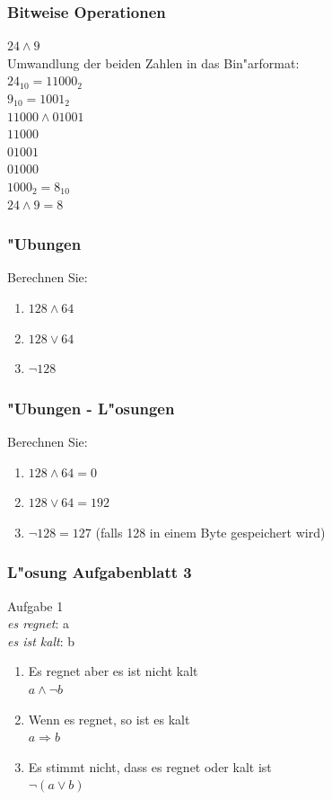 \documentclass{beamer}
\begin{document}
\frame
{
	\frametitle{Bitweise Operationen}
	$24 \land 9$\\
	\vspace{4mm}
	Umwandlung der beiden Zahlen in das Bin"arformat:\\
	$24_{10} = 11000_2$\\
	$9_{10} = 1001_2$\\
	\vspace{4mm}
	$11000 \land 01001$\\
	$11000$\\
	$01001$\\
	$01000$\\
	\vspace{4mm}
	$1000_2 = 8_{10}$\\
	$24 \land 9 = 8$
}

\frame
{
	\frametitle{"Ubungen}
	Berechnen Sie:
	\begin{enumerate}
	\item $128 \land 64$
	\item $128 \lor 64$
	\item $\lnot 128$
	\end{enumerate}
}

\frame
{
	\frametitle{"Ubungen - L"osungen}
	Berechnen Sie:
	\begin{enumerate}
	\item $128 \land 64 = 0$
	\item $128 \lor 64 = 192$
	\item $\lnot 128 = 127$ (falls 128 in einem Byte gespeichert wird)
	\end{enumerate}
}

\frame
{
	\frametitle{L"osung Aufgabenblatt 3}
	Aufgabe 1\\
	\emph{es regnet}: a\\
	\emph{es ist kalt}: b
	\begin{enumerate}
	\item Es regnet aber es ist nicht kalt\\
	$a \land \lnot b$
	\item Wenn es regnet, so ist es kalt\\
	$a \Rightarrow b$	
	\item Es stimmt nicht, dass es regnet oder kalt ist\\
	$\lnot (a \lor b)$
	\end{enumerate}
}
\end{document}
